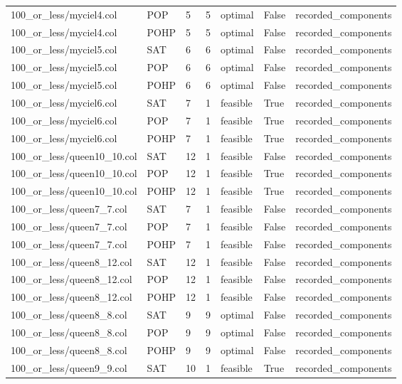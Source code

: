 \begin{table}[htbp]
\begin{tabular}{lllllll}
100\_or\_less/myciel4.col & POP & 5 & 5 & optimal & False & recorded\_components \\
100\_or\_less/myciel4.col & POHP & 5 & 5 & optimal & False & recorded\_components \\
100\_or\_less/myciel5.col & SAT & 6 & 6 & optimal & False & recorded\_components \\
100\_or\_less/myciel5.col & POP & 6 & 6 & optimal & False & recorded\_components \\
100\_or\_less/myciel5.col & POHP & 6 & 6 & optimal & False & recorded\_components \\
100\_or\_less/myciel6.col & SAT & 7 & 1 & feasible & True & recorded\_components \\
100\_or\_less/myciel6.col & POP & 7 & 1 & feasible & True & recorded\_components \\
100\_or\_less/myciel6.col & POHP & 7 & 1 & feasible & True & recorded\_components \\
100\_or\_less/queen10\_10.col & SAT & 12 & 1 & feasible & False & recorded\_components \\
100\_or\_less/queen10\_10.col & POP & 12 & 1 & feasible & True & recorded\_components \\
100\_or\_less/queen10\_10.col & POHP & 12 & 1 & feasible & True & recorded\_components \\
100\_or\_less/queen7\_7.col & SAT & 7 & 1 & feasible & False & recorded\_components \\
100\_or\_less/queen7\_7.col & POP & 7 & 1 & feasible & False & recorded\_components \\
100\_or\_less/queen7\_7.col & POHP & 7 & 1 & feasible & False & recorded\_components \\
100\_or\_less/queen8\_12.col & SAT & 12 & 1 & feasible & False & recorded\_components \\
100\_or\_less/queen8\_12.col & POP & 12 & 1 & feasible & False & recorded\_components \\
100\_or\_less/queen8\_12.col & POHP & 12 & 1 & feasible & False & recorded\_components \\
100\_or\_less/queen8\_8.col & SAT & 9 & 9 & optimal & False & recorded\_components \\
100\_or\_less/queen8\_8.col & POP & 9 & 9 & optimal & False & recorded\_components \\
100\_or\_less/queen8\_8.col & POHP & 9 & 9 & optimal & False & recorded\_components \\
100\_or\_less/queen9\_9.col & SAT & 10 & 1 & feasible & True & recorded\_components \\

\end{tabular}
\end{table}
